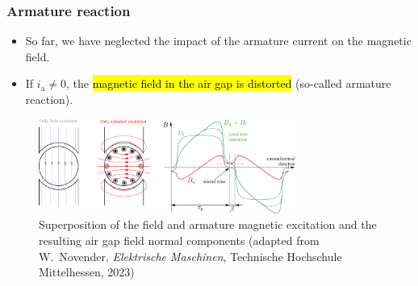 \begin{frame}
	\frametitle{Armature reaction}
	\begin{itemize}
		\item So far, we have neglected the impact of the armature current on the magnetic field.
		\item If $i_\mathrm{a}\neq 0$, the \hl{magnetic field in the air gap is distorted} (so-called armature reaction).
	\end{itemize}
    \begin{figure}
        \centering
        \includegraphics[width=0.75\textwidth]{fig/lec03/Armature_reaction.pdf}
        \caption{Superposition of the field and armature magnetic excitation and the resulting air gap field normal components (adapted from W.~Novender, \textit{Elektrische Maschinen}, Technische Hochschule Mittelhessen, 2023)} 
		\label{fig:Armature_reaction}
    \end{figure}
\end{frame}

